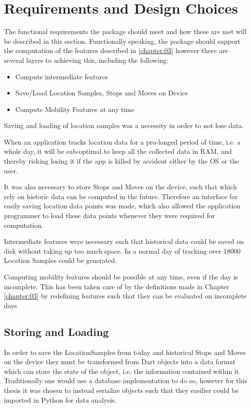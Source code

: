 \section{Requirements and Design Choices}
The functional requirements the package should meet and how these are met will be described in this section. Functionally speaking, the package should support the computation of the features described in \ref{chapter:03} however there are several layers to achieving this, including the following:

\begin{itemize}
    \item Compute intermediate features
    \item Save/Load Location Samples, Stops and Moves on Device
    \item Compute Mobility Features at any time
\end{itemize}

Saving and loading of location samples was a necessity in order to not lose data.

When an application tracks location data for a pro-longed period of time, i.e. a whole day, it will be sub-optimal to keep all the collected data in RAM, and thereby risking losing it if the app is killed by accident either by the OS or the user. 

It was also necessary to store Stops and Moves on the device, such that which rely on historic data can be computed in the future. 
Therefore an interface for easily saving location data points was made, which also allowed the application programmer to load these data points whenever they were required for computation. 

Intermediate features were necessary such that historical data could be saved on disk without taking up too much space. In a normal day of tracking over 18000 Location Samples could be generated.

Computing mobility features should be possible at any time, even if the day is incomplete. This has been taken care of by the definitions made in Chapter \ref{chapter:03} by redefining features such that they can be evaluated on incomplete days

\subsection{Storing and Loading}
In order to save the LocationSamples from today and historical Stops and Moves on the device they must be transformed from Dart objects into a data format which can store the state of the object, i.e. the information contained within it. Traditionally one would use a database implementation to do so, however for this thesis it was chosen to instead serialize objects such that they easilier could be imported in Python for data analysis.

